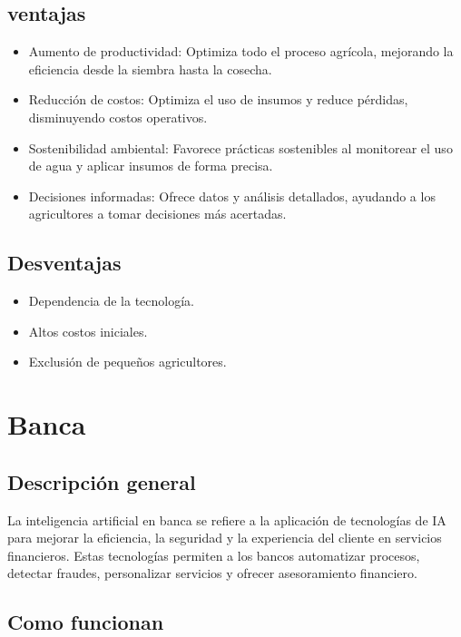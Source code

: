 \documentclass[12pt]{article}
\begin{document}
\subsection{ventajas}

\begin{itemize}
    \item Aumento de productividad: 
    Optimiza todo el proceso agrícola, mejorando la eficiencia desde la siembra hasta la cosecha.
    \item Reducción de costos: 
    Optimiza el uso de insumos y reduce pérdidas, disminuyendo costos operativos.
    \item Sostenibilidad ambiental: 
    Favorece prácticas sostenibles al monitorear el uso de agua y aplicar insumos de forma precisa.
    \item Decisiones informadas: 
    Ofrece datos y análisis detallados, ayudando a los agricultores a tomar decisiones más acertadas.
\end{itemize}

\subsection{Desventajas}

\begin{itemize}
    \item Dependencia de la tecnología.
    \item Altos costos iniciales.
    \item Exclusión de pequeños agricultores.
\end{itemize}

\section{Banca}

\subsection{Descripción general}

La inteligencia artificial en banca se refiere a la aplicación de tecnologías de IA para mejorar la eficiencia, la seguridad y la 
experiencia del cliente en servicios financieros. Estas tecnologías permiten a los bancos automatizar procesos, detectar fraudes,
personalizar servicios y ofrecer asesoramiento financiero.

\subsection{Como funcionan}
\end{document}
